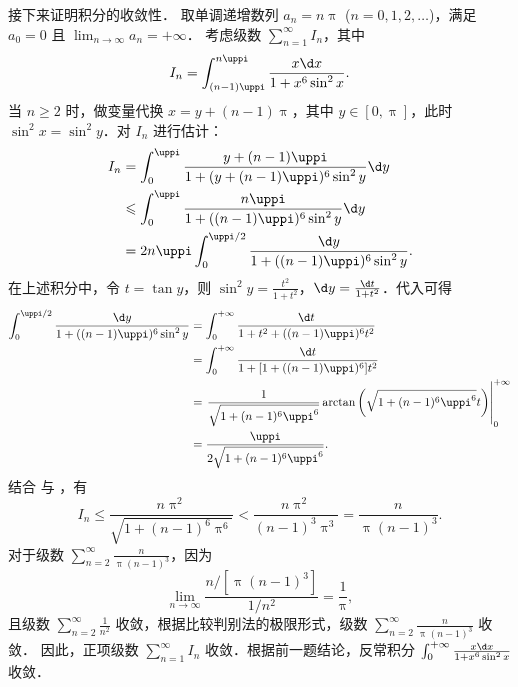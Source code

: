 \begin{myproof}
    接下来证明积分的收敛性．
    取单调递增数列 $a_n = n\uppi$ ($n = 0, 1, 2, \dots$)，满足 $a_0 = 0$ 且 $\lim_{n \to \infty} a_n = +\infty$．
    考虑级数 $\sum_{n=1}^{\infty} I_n$，其中
    \begin{equation}\label{eq:series-def-3}
        I_n = \int_{(n-1)\uppi}^{n\uppi} \frac{x \d x}{1 + x^6 \sin^2 x}.
    \end{equation}
    当 $n \geqslant 2$ 时，做变量代换 $x = y + (n-1)\uppi$，其中 $y \in [0, \uppi]$，此时 $\sin^2 x = \sin^2 y$．对 $I_n$ 进行估计：
    \begin{equation}\label{eq:estimation-4}
        \begin{aligned}
            I_n & = \int_0^{\uppi} \frac{y + (n-1)\uppi}{1 + (y + (n-1)\uppi)^6 \sin^2 y} \d y \\
                & \leqslant \int_0^{\uppi} \frac{n\uppi}{1 + ((n-1)\uppi)^6 \sin^2 y} \d y     \\
                & = 2n\uppi \int_0^{\uppi/2} \frac{\d y}{1 + ((n-1)\uppi)^6 \sin^2 y}.
        \end{aligned}
    \end{equation}
    在上述积分中，令 $t = \tan y$，则 $\sin^2 y = \frac{t^2}{1 + t^2}$，$\d y = \frac{\d t}{1 + t^2}$．代入可得
    \begin{equation}\label{eq:integral-calc-5}
        \begin{aligned}
            \int_0^{\uppi/2} \frac{\d y}{1 + ((n-1)\uppi)^6 \sin^2 y} & = \int_0^{+\infty} \frac{\d t}{1 + t^2 + ((n-1)\uppi)^6 t^2}                                                       \\
                                                                      & = \int_0^{+\infty} \frac{\d t}{1 + [1 + ((n-1)\uppi)^6] t^2}                                                       \\
                                                                      & = \left. \frac{1}{\sqrt{1 + (n-1)^6 \uppi^6}} \arctan\left(\sqrt{1 + (n-1)^6 \uppi^6} t\right) \right|_0^{+\infty} \\
                                                                      & = \frac{\uppi}{2 \sqrt{1 + (n-1)^6 \uppi^6}}.
        \end{aligned}
    \end{equation}
    结合  与 ，有
    \begin{equation}\label{eq:final-est-6}
        I_n \leqslant \frac{n \uppi^2}{\sqrt{1 + (n-1)^6 \uppi^6}} < \frac{n \uppi^2}{(n-1)^3 \uppi^3} = \frac{n}{\uppi (n-1)^3}.
    \end{equation}
    对于级数 $\sum_{n=2}^{\infty} \frac{n}{\uppi (n-1)^3}$，因为
    \begin{equation}\label{eq:limit-comp-7}
        \lim_{n \to \infty} \frac{n / [\uppi (n-1)^3]}{1 / n^2} = \frac{1}{\uppi},
    \end{equation}
    且级数 $\sum_{n=2}^{\infty} \frac{1}{n^2}$ 收敛，根据比较判别法的极限形式，级数 $\sum_{n=2}^{\infty} \frac{n}{\uppi (n-1)^3}$ 收敛．
    因此，正项级数 $\sum_{n=1}^{\infty} I_n$ 收敛．根据前一题结论，反常积分 $\int_0^{+\infty} \frac{x \d x}{1 + x^6 \sin^2 x}$ 收敛．
\end{myproof}

